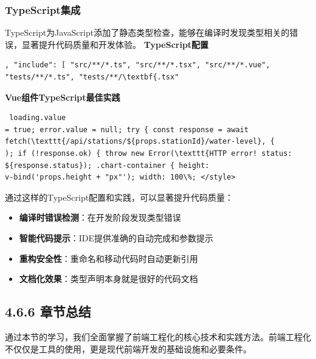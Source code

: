\subsubsection{TypeScript集成}\label{typescriptux96c6ux6210} TypeScript为JavaScript添加了静态类型检查，能够在编译时发现类型相关的错误，显著提升代码质量和开发体验。
\textbf{TypeScript配置} \begin{lstlisting}[style=json] , "include": [ "src/**/*.ts", "src/**/*.tsx", "src/**/*.vue",
"tests/**/*.ts", "tests/**/\textbf{.tsx" \end{lstlisting} \textbf{Vue组件TypeScript最佳实践} \begin{lstlisting} loading.value
= true; error.value = null; try { const response = await fetch(\texttt{/api/stations/${props.stationId}/water-level}, {
); if (!response.ok) { throw new Error(\texttt{HTTP error! status: ${response.status}); .chart-container { height:
v-bind('props.height + "px"'); width: 100\%; </style> \end{lstlisting} 通过这样的TypeScript配置和实践，可以显著提升代码质量： \begin{itemize}
\tightlist \item \textbf{编译时错误检测}：在开发阶段发现类型错误 \item \textbf{智能代码提示}：IDE提供准确的自动完成和参数提示 \item
\textbf{重构安全性}：重命名和移动代码时自动更新引用 \item \textbf{文档化效果}：类型声明本身就是很好的代码文档 \end{itemize} \subsection{4.6.6
章节总结}\label{ux7ae0ux8282ux603bux7ed3} 通过本节的学习，我们全面掌握了前端工程化的核心技术和实践方法。前端工程化不仅仅是工具的使用，更是现代前端开发的基础设施和必要条件。
